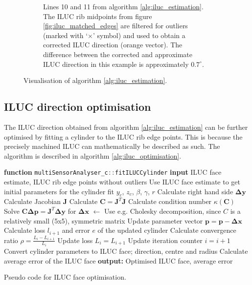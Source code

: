 \begin{figure}[H]
\begin{subfigure}[c]{0.45\textwidth}
        \caption{Lines 10 and 11 from algorithm \ref{alg:iluc_estimation}. The ILUC rib midpoints from figure \ref{fig:iluc_matched_edges} are filtered for outliers (marked with `$\times$' symbol) and used to obtain a corrected ILUC direction (orange vector). The difference between the corrected and approximate ILUC direction in this example is approximately $0.7^{\circ}$.}
        \label{fig:iluc_corrected_direction}
    \end{subfigure}
    \caption{Visualisation of algorithm \ref{alg:iluc_estimation}.}
    \label{fig:iluc_estimation}
\end{figure}

\subsection{ILUC direction optimisation}
The ILUC direction obtained from algorithm \ref{alg:iluc_estimation} can be further optimised by fitting a cylinder to the ILUC rib edge points. This is because the precisely machined ILUC can mathematically be described as such. The algorithm is described in algorithm \ref{alg:iluc_optimisation}.
\begin{algorithm}[H]
    \begin{algorithmic}[1]
        \State \textbf{function} \lstinline[language=C]|multiSensorAnalyser_c::fitILUCCylinder|
        \State \textbf{input} ILUC face estimate, ILUC rib edge points without outliers
        \State Use ILUC face estimate to get initial parameters for the cylinder fit $y_c$, $z_c$, $\beta$, $\gamma$, $r$
        \State Calculate right hand side $\mathbf{\Delta y}$
        \State Calculate Jacobian $\mathbf{J}$
        \State Calculate $\mathbf{C} = \mathbf{J}^T \mathbf{J}$
        \State Calculate condition number $\kappa(\mathbf{C})$
        \State Solve $\mathbf{C} \mathbf{\Delta p} = \mathbf{J}^T \mathbf{\Delta y}$ for $\mathbf{\Delta x}$ $\leftarrow$ Use e.g. Cholesky decomposition, since $C$ is a relatively small (5x5), symmetric matrix
        \State Update parameter vector $\mathbf{p} = \mathbf{p} - \mathbf{\Delta x}$
        \State Calculate loss $l_{i+1}$ and error $e$ of the updated cylinder
        \State Calculate convergence ratio $\rho = \frac{L_i - L_{i+1}}{L_i}$
        \State Update loss $L_i = L_{i+1}$
        \State Update iteration counter $i = i + 1$
        \EndWhile
        \State Convert cylinder parameters to ILUC face; direction, centre and radius
        \State Calculate average error of the ILUC face
        \State \textbf{output: } Optimised ILUC face, average error
    \end{algorithmic}
    \caption{Pseudo code for ILUC face optimisation.}
    \label{alg:iluc_optimisation}
\end{algorithm}

